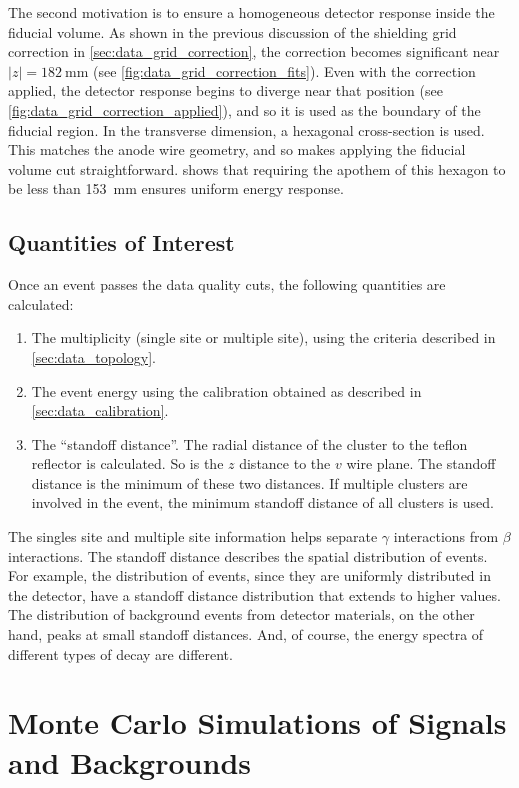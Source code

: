 \documentclass[herrin-thesis.tex]{subfiles}
\begin{document}
The second motivation is to ensure a homogeneous detector response inside the fiducial volume. As shown in the previous discussion of the shielding grid correction in \cref{sec:data_grid_correction}, the correction becomes significant near \(|z|=\SI{182}{\mm}\) (see \cref{fig:data_grid_correction_fits}). Even with the correction applied, the detector response begins to diverge near that position (see \cref{fig:data_grid_correction_applied}), and so it is used as the boundary of the fiducial region. In the transverse dimension, a hexagonal cross-section is used. This matches the anode wire geometry, and so makes applying the fiducial volume cut straightforward.  shows that requiring the apothem of this hexagon to be less than \SI{153}{\mm} ensures uniform energy response.

\subsection{Quantities of Interest}
\label{sec:analysis_quantities_of_interest}
Once an event passes the data quality cuts, the following quantities are calculated:
\begin{enumerate}
\item The multiplicity (single site or multiple site), using the criteria described in \cref{sec:data_topology}.
\item The event energy using the calibration obtained as described in \cref{sec:data_calibration}.
\item The ``standoff distance''. The radial distance of the cluster to the teflon reflector is calculated. So is the \(z\) distance to the \(v\) wire plane. The standoff distance is the minimum of these two distances. If multiple clusters are involved in the event, the minimum standoff distance of all clusters is used.
\end{enumerate}

The singles site and multiple site information helps separate \(\gamma\) interactions from \(\beta\) interactions. The standoff distance describes the spatial distribution of events. For example, the distribution of \twonu{} events, since they are uniformly distributed in the detector, have a standoff distance distribution that extends to higher values. The distribution of background events from detector materials, on the other hand, peaks at small standoff distances. And, of course, the energy spectra of different types of decay are different.

\section{Monte Carlo Simulations of Signals and Backgrounds}
\label{sec:analysis_monte_carlo}
\end{document}
